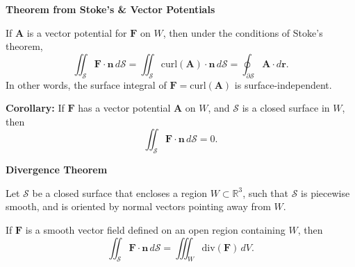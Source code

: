 \documentclass{article}
\newcommand{\R}{\mathbb{R}}
\newenvironment{definition}[1]{
    \par\noindent\textbf{#1}\par\noindent
}{
    \par \vspace{0.5cm}
}
\begin{document}
\begin{definition}{Theorem from Stoke's \& Vector Potentials}
If \(\bm{A}\) is a vector potential for \(\bm{F}\) on \(W\), then under the conditions of Stoke’s theorem,
\[ \iint_{\mathcal{S}} \bm{F} \cdot \bm{n} \, d\mathcal{S} = \iint_{\mathcal{S}} \text{curl}(\bm{A}) \cdot \bm{n} \, d\mathcal{S} = \oint_{\partial \mathcal{S}} \bm{A} \cdot d\bm{r}. \]
In other words, the surface integral of \(\bm{F} = \text{curl}(\bm{A})\) is surface-independent.

\textbf{Corollary:} If \(\bm{F}\) has a vector potential \(\bm{A}\) on \(W\), and \(\mathcal{S}\) is a closed surface in \(W\), then 
\[ \iint_{\mathcal{S}} \bm{F} \cdot \bm{n} \, d\mathcal{S} = 0. \]
\end{definition}

\begin{definition}{Divergence Theorem}
Let \(\mathcal{S}\) be a closed surface that encloses a region \(W \subset \R^3\), such that \(\mathcal{S}\) is piecewise smooth, and is oriented by normal vectors pointing away from \(W\).

If \(\bm{F}\) is a smooth vector field defined on an open region containing \(W\), then 
\[ \iint_{\mathcal{S}} \bm{F} \cdot \bm{n} \, d\mathcal{S} = \iiint_{W} \text{div}(\bm{F}) \, dV. \]
\end{definition}
\end{document}
